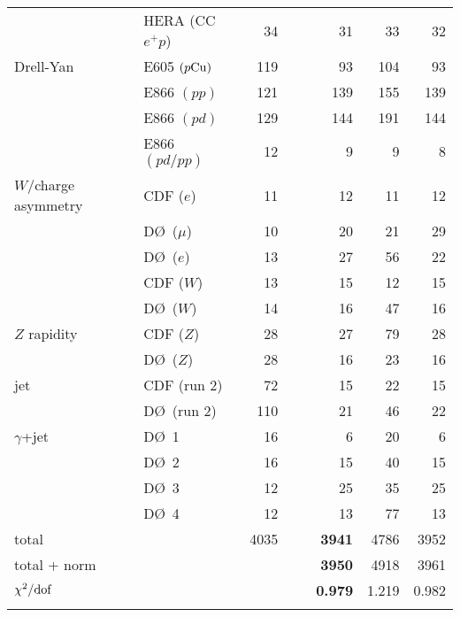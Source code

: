 \documentclass[aps,prd,amsmath,preprint]{revtex4}
\begin{document}
\begin{table}[t]
{\begin{tabular}[c]{llrrrr}
  & HERA (CC $e^+p$) 	\cite{HERA1}    &  34 &  31 &  33 &  32 \\
Drell-Yan
  & E605 $(p{\rm Cu})$	\cite{E605}     & 119 &  93 & 104 &  93 \\ %
  & E866 $(pp)$		\cite{E866}     & 121 & 139 & 155 & 139 \\
  & E866 $(pd)$ 	\cite{E866}     & 129 & 144 & 191 & 144 \\
  & E866 $(pd/pp)$ 	\cite{E866rat}  &  12 &   9 &   9 &   8 \\
$W/$charge asymmetry
  & CDF  ($e$)		\cite{CDF_e}    &  11 &  12 &  11 &  12 \\
  & D\O\ ($\mu$)  	\cite{D0_mu}    &  10 &  20 &  21 &  29 \\  
  & D\O\ ($e$) 		\cite{D0_e}     &  13 &  27 &  56 &  22 \\
  & CDF  ($W$)    	\cite{CDF_W}    &  13 &  15 &  12 &  15 \\
  & D\O\ ($W$)    	\cite{D0_W}     &  14 &  16 &  47 &  16 \\
$Z$ rapidity
  & CDF  ($Z$)		\cite{CDFZ}     &  28 &  27 &  79 &  28 \\ 
  & D\O\ ($Z$)		\cite{D0Z}      &  28 &  16 &  23 &  16 \\
jet
  & CDF  (run 2)       	\cite{CDFjet2}  &  72 &  15 &  22 &  15 \\
  & D\O\ (run 2)       	\cite{D0jet2}   & 110 &  21 &  46 &  22 \\
$\gamma$+jet
  & D\O\ 1           	\cite{D0gamjet} &  16 &   6 &  20 &   6 \\    
  & D\O\ 2           	\cite{D0gamjet} &  16 &  15 &  40 &  15 \\
  & D\O\ 3           	\cite{D0gamjet} &  12 &  25 &  35 &  25 \\
  & D\O\ 4           	\cite{D0gamjet} &  12 &  13 &  77 &  13 \\ \hline
%
total        		&		& 4035 &\ \ \ \ {\bf 3941} & 4786 & 3952 \\
total + norm 		&		&      &\ \ \ \ {\bf 3950} & 4918 & 3961 \\ \hline
$\chi^2/{\rm dof}$	&		&      & {\bf 0.979} & 1.219 & 0.982 \\  \hline\\
%
\end{tabular}
}
\label{tab:chi2}
\end{table}
\end{document}
